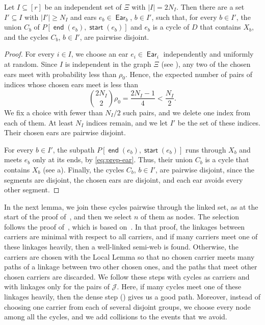 \documentclass[fontsize=12pt,leading=14pt]{fullpaper}
\DeclareMathOperator{\st}{\mathsf{start}}
\DeclareMathOperator{\en}{\mathsf{end}}
\DeclareMathOperator{\Ear}{\mathsf{Ear}}
\newcommand{\Jcal}{\mathcal{J}}
\newcounter{step}
\begin{document}
\begin{lemma}\label{lem:prep-cycles}
  Let $I\subseteq[r]$ be an independent set of $\Xi$ with $|I|=2N_I$.
  Then there are a set $I'\subseteq I$ with $|I'|\ge N_I$ and ears $e_b\in\Ear_b$, $b\in I'$, such that, for every $b\in I'$, the union $C_b$ of $P[\en(e_b),\st(e_b)]$ and $e_b$ is a cycle of $D$ that contains $X_b$, and the cycles $C_b$, $b\in I'$, are pairwise disjoint.
\end{lemma}

\begin{proof}
  For every $i\in I$, we choose an ear $e_i\in\Ear_i$ independently and uniformly at random.
  Since $I$ is independent in the graph $\Xi$ (see ), any two of the chosen ears meet with probability less than $\rho_0$.
  Hence, the expected number of pairs of indices whose chosen ears meet is less than
  \[
    \binom{2N_I}{2}\rho_0=\frac{2N_I-1}{4}<\frac{N_I}{2}.
  \]
  We fix a choice with fewer than $N_I/2$ such pairs, and we delete one index from each of them.
  At least $N_I$ indices remain, and we let $I'$ be the set of these indices.
  Their chosen ears are pairwise disjoint.

  For every $b\in I'$, the subpath $P[\en(e_b),\st(e_b)]$ runs through $X_b$ and meets $e_b$ only at its ends, by \eqref{eq:prep-ear}.
  Thus, their union $C_b$ is a cycle that contains $X_b$ (see a).
  Finally, the cycles $C_b$, $b\in I'$, are pairwise disjoint, since the segments are disjoint, the chosen ears are disjoint, and each ear avoids every other segment.
\end{proof}

In the next lemma, we join these cycles pairwise through the linked set, as at the start of the proof of~\cite[Lemma~5.2]{CLNS26}, and then we select $n$ of them as nodes.
The selection follows the proof of~\cite[Lemma~5.11]{HKMM26a}, which is based on~\cite[Lemma~4.7]{KawarabayashiK15}.
In that proof, the linkages between carriers are minimal with respect to all carriers, and if many carriers meet one of these linkages heavily, then a well-linked semi-web is found.
Otherwise, the carriers are chosen with the Local Lemma so that no chosen carrier meets many paths of a linkage between two other chosen ones, and the paths that meet other chosen carriers are discarded.
We follow these steps with cycles as carriers and with linkages only for the pairs of $\Jcal$.
Here, if many cycles meet one of these linkages heavily, then the dense step () gives us a good path.
Moreover, instead of choosing one carrier from each of several disjoint groups, we choose every node among all the cycles, and we add collisions to the events that we avoid.
\end{document}
